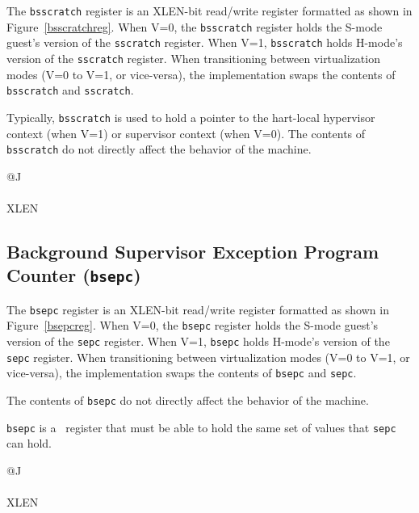 The {\tt bsscratch} register is an XLEN-bit read/write register formatted as shown
in Figure~\ref{bsscratchreg}.  When V=0, the {\tt bsscratch} register holds the
S-mode guest's version of the {\tt sscratch} register.  When V=1, {\tt bsscratch}
holds H-mode's version of the {\tt sscratch} register.  When transitioning between
virtualization modes (V=0 to V=1, or vice-versa), the implementation swaps the
contents of {\tt bsscratch} and {\tt sscratch}.

Typically, {\tt bsscratch} is used to hold a pointer to the hart-local
hypervisor context (when V=1) or supervisor context (when V=0).  The
contents of {\tt bsscratch} do not directly affect the behavior of
the machine.

\begin{figure*}[h!]
{\footnotesize
\begin{center}
\begin{tabular}{@{}J}
 \\
\hline
{} \\
\hline
XLEN \\
\end{tabular}
\end{center}
}
\vspace{-0.1in}
\caption{Background supervisor scratch register ({\tt bsscratch}).}
\label{bsscratchreg}
\end{figure*}

\subsection{Background Supervisor Exception Program Counter ({\tt bsepc})}

The {\tt bsepc} register is an XLEN-bit read/write register formatted as shown
in Figure~\ref{bsepcreg}.  When V=0, the {\tt bsepc} register holds the
S-mode guest's version of the {\tt sepc} register.  When V=1, {\tt bsepc}
holds H-mode's version of the {\tt sepc} register.  When transitioning between
virtualization modes (V=0 to V=1, or vice-versa), the implementation swaps the
contents of {\tt bsepc} and {\tt sepc}.

The contents of {\tt bsepc} do not directly affect the behavior of
the machine.

{\tt bsepc} is a \warl\ register that must be able to hold the same set of
values that {\tt sepc} can hold.

\begin{figure*}[h!]
{\footnotesize
\begin{center}
\begin{tabular}{@{}J}
 \\
\hline
{} \\
\hline
XLEN \\
\end{tabular}
\end{center}
}
\vspace{-0.1in}
\caption{Background supervisor exception program counter ({\tt bsepc}).}
\label{bsepcreg}
\end{figure*}


